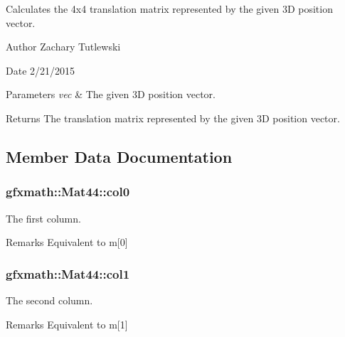 Calculates the 4x4 translation matrix represented by the given 3\+D position vector. 

\begin{DoxyAuthor}{Author}
Zachary Tutlewski 
\end{DoxyAuthor}
\begin{DoxyDate}{Date}
2/21/2015
\end{DoxyDate}

\begin{DoxyParams}{Parameters}
{\em vec} & The given 3\+D position vector.\\
\hline
\end{DoxyParams}
\begin{DoxyReturn}{Returns}
The translation matrix represented by the given 3\+D position vector. 
\end{DoxyReturn}


\subsection{Member Data Documentation}
\hypertarget{structgfxmath_1_1_mat44_a14a9f934c2487a5dd9e4702a0b539cb4}{}
\subsubsection[{col0}]{ gfxmath\+::\+Mat44\+::col0}\label{structgfxmath_1_1_mat44_a14a9f934c2487a5dd9e4702a0b539cb4}


The first column. 

\begin{DoxyRemark}{Remarks}
Equivalent to m\mbox{[}0\mbox{]} 
\end{DoxyRemark}
\hypertarget{structgfxmath_1_1_mat44_a9ac4cf40ac05a9ad94964d247d8256e1}{}
\subsubsection[{col1}]{ gfxmath\+::\+Mat44\+::col1}\label{structgfxmath_1_1_mat44_a9ac4cf40ac05a9ad94964d247d8256e1}


The second column. 

\begin{DoxyRemark}{Remarks}
Equivalent to m\mbox{[}1\mbox{]} 
\end{DoxyRemark}
\hypertarget{structgfxmath_1_1_mat44_aa810627c4b5df8432b36befdd4649763}{}
